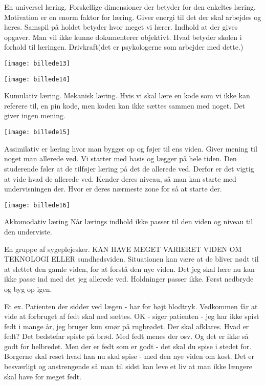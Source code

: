 \documentclass[12pt, letterpaper]{article}
\begin{document}
En universel læring.
Forskellige dimensioner der betyder for den enkeltes læring. 
Motivation er en enorm faktor for læring. Giver energi til det der skal arbejdes og læres.
Samspil på holdet betyder hvor meget vi lærer.
Indhold at der gives opgaver. Man vil ikke kunne dokumenterer objektivt. Hvad betyder skolen i forhold til læringen.
Drivkraft(det er psykologerne som arbejder med dette.)

\begin{center}
\texttt{[image: billede13]}
\end{center}

\begin{center}
\texttt{[image: billede14]}
\end{center}
Kumulativ læring. Mekanisk læring. Hvis vi skal lære en kode som vi ikke kan referere til, en pin kode, men koden kan ikke sættes sammen med noget. Det giver ingen mening. 

\begin{center}
\texttt{[image: billede15]}
\end{center}

Assimilativ er læring hvor man bygger op og føjer til ens viden. Giver mening til noget man allerede ved. Vi starter med basis og lægger på hele tiden. Den studerende føler at de tilføjer læring på det de allerede ved. Derfor er det vigtig at vide hvad de allerede ved. Kender deres niveau, så man kan starte med undervisningen der. Hvor er deres nærmeste zone for så at starte der.

\begin{center}
\texttt{[image: billede16]}
\end{center}

Akkomodativ læring 
Når lærings indhold ikke passer til den viden og niveau til den underviste.

En gruppe af sygeplejesker. KAN HAVE MEGET VARIERET VIDEN OM TEKNOLOGI ELLER sundhedsviden. Situationen kan være at de bliver nødt til at slettet den gamle viden, for at forstå den nye viden. Det jeg skal lære nu kan ikke passe ind med det jeg allerede ved. Holdninger passer ikke. Først nedbryde og byg op igen. 

Et ex. Patienten der sidder ved lægen - har for højt blodtryk. Vedkommen får at vide at forbruget af fedt skal ned sættes. OK - siger patienten - jeg har ikke spist fedt i mange år, jeg bruger kun smør på rugbrødet. Der skal afklares. Hvad er fedt? Det bedstefar spiste på brød. Med fedt menes der osv. Og det er ikke så godt for helbredet. Men der er fedt som er godt - det skal du spise i stedet for.
Borgerne skal reset hvad han nu skal spise - med den nye viden om kost. Det er besværligt og anstrengende så man til sidst kan leve et liv at man ikke længere skal have for meget fedt.
\end{document}

